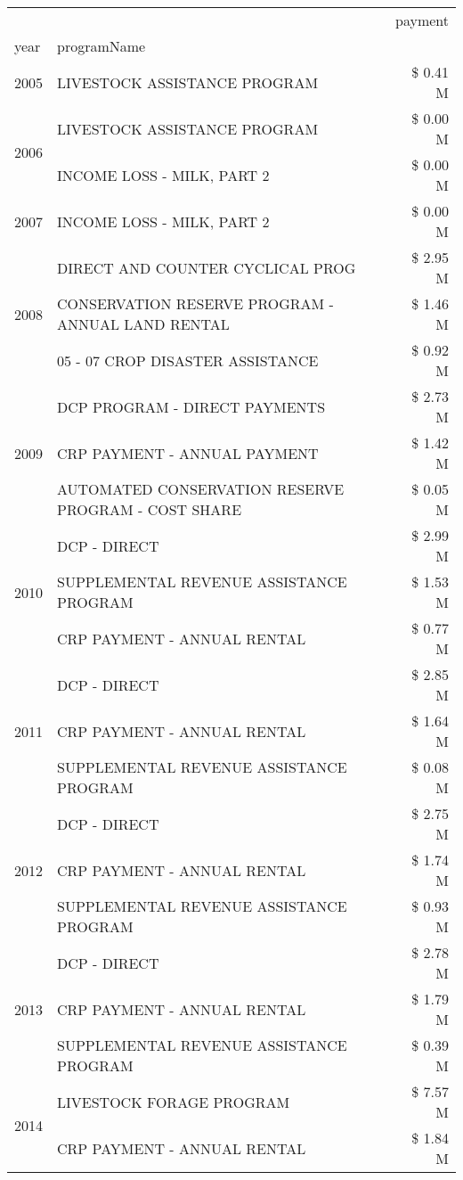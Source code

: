 \begin{tabular}{llr}
\toprule
 &  & payment \\
year & programName &  \\
\midrule
2005 & LIVESTOCK ASSISTANCE PROGRAM & \$ 0.41 M \\
\cline{1-3}
\multirow[t]{2}{*}{2006} & LIVESTOCK ASSISTANCE PROGRAM & \$ 0.00 M \\
 & INCOME LOSS - MILK, PART 2 & \$ 0.00 M \\
\cline{1-3}
2007 & INCOME LOSS - MILK, PART 2 & \$ 0.00 M \\
\cline{1-3}
\multirow[t]{3}{*}{2008} & DIRECT AND COUNTER CYCLICAL PROG & \$ 2.95 M \\
 & CONSERVATION RESERVE PROGRAM - ANNUAL LAND RENTAL & \$ 1.46 M \\
 & 05 - 07 CROP DISASTER ASSISTANCE & \$ 0.92 M \\
\cline{1-3}
\multirow[t]{3}{*}{2009} & DCP PROGRAM - DIRECT PAYMENTS & \$ 2.73 M \\
 & CRP PAYMENT - ANNUAL PAYMENT & \$ 1.42 M \\
 & AUTOMATED CONSERVATION RESERVE PROGRAM - COST SHARE & \$ 0.05 M \\
\cline{1-3}
\multirow[t]{3}{*}{2010} & DCP - DIRECT & \$ 2.99 M \\
 & SUPPLEMENTAL REVENUE ASSISTANCE PROGRAM & \$ 1.53 M \\
 & CRP PAYMENT - ANNUAL RENTAL & \$ 0.77 M \\
\cline{1-3}
\multirow[t]{3}{*}{2011} & DCP - DIRECT & \$ 2.85 M \\
 & CRP PAYMENT - ANNUAL RENTAL & \$ 1.64 M \\
 & SUPPLEMENTAL REVENUE ASSISTANCE PROGRAM & \$ 0.08 M \\
\cline{1-3}
\multirow[t]{3}{*}{2012} & DCP - DIRECT & \$ 2.75 M \\
 & CRP PAYMENT - ANNUAL RENTAL & \$ 1.74 M \\
 & SUPPLEMENTAL REVENUE ASSISTANCE PROGRAM & \$ 0.93 M \\
\cline{1-3}
\multirow[t]{3}{*}{2013} & DCP - DIRECT & \$ 2.78 M \\
 & CRP PAYMENT - ANNUAL RENTAL & \$ 1.79 M \\
 & SUPPLEMENTAL REVENUE ASSISTANCE PROGRAM & \$ 0.39 M \\
\cline{1-3}
\multirow[t]{3}{*}{2014} & LIVESTOCK FORAGE PROGRAM & \$ 7.57 M \\
 & CRP PAYMENT - ANNUAL RENTAL & \$ 1.84 M \\

\end{tabular}
